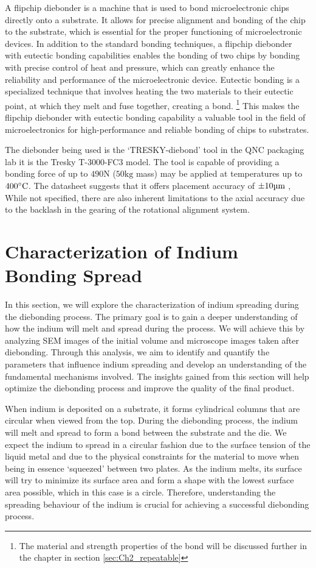 A flipchip diebonder is a machine that is used to bond microelectronic chips directly onto a substrate. It allows for precise alignment and bonding of the chip to the substrate, which is essential for the proper functioning of microelectronic devices. In addition to the standard bonding techniques, a flipchip diebonder with eutectic bonding capabilities enables the bonding of two chips by bonding with precise control of heat and pressure, which can greatly enhance the reliability and performance of the microelectronic device. Eutectic bonding is a specialized technique that involves heating the two materials to their eutectic point, at which they melt and fuse together, creating a bond. \footnote{The material and strength properties of the bond will be discussed further in the chapter in section \ref{sec:Ch2_repeatable}} This makes the flipchip diebonder with eutectic bonding capability a valuable tool in the field of microelectronics for high-performance and reliable bonding of chips to substrates.


The diebonder being used is the `TRESKY-diebond' tool in the QNC packaging lab it is the Tresky T-3000-FC3 model.
The tool is capable of providing a bonding force of up to $490 \unit{\newton}$ ($50 \unit{\kg}$ mass) may be applied at temperatures up to $400 \dC$. The datasheet suggests that it offers placement accuracy of $\pm10\um$ \cite{diebonderDatasheet}, While not specified, there are also inherent limitations to the axial accuracy due to the backlash in the gearing of the rotational alignment system.



\section{Characterization of Indium Bonding Spread}
\label{sec:indiumSpread}

In this section, we will explore the characterization of indium spreading during the diebonding process. The primary goal is to gain a deeper understanding of how the indium will melt and spread during the process. We will achieve this by analyzing SEM images of the initial volume and microscope images taken after diebonding. Through this analysis, we aim to identify and quantify the parameters that influence indium spreading and develop an understanding of the fundamental mechanisms involved. The insights gained from this section will help optimize the diebonding process and improve the quality of the final product.

When indium is deposited on a substrate, it forms cylindrical columns that are circular when viewed from the top. During the diebonding process, the indium will melt and spread to form a bond between the substrate and the die. We expect the indium to spread in a circular fashion due to the surface tension of the liquid metal and due to the physical constraints for the material to move when being in essence `squeezed' between two plates. As the indium melts, its surface will try to minimize its surface area and form a shape with the lowest surface area possible, which in this case is a circle. Therefore, understanding the spreading behaviour of the indium is crucial for achieving a successful diebonding process.

